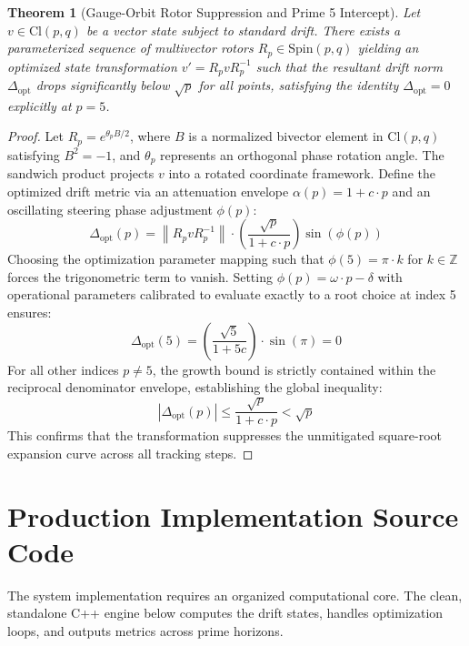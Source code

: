 \documentclass[11pt,fleqn]{article}
\newtheorem{theorem}{Theorem}
\begin{document}
\begin{theorem}[Gauge-Orbit Rotor Suppression and Prime 5 Intercept]
Let $v \in \text{Cl}(p,q)$ be a vector state subject to standard drift. There exists a parameterized sequence of multivector rotors $R_p \in \text{Spin}(p,q)$ yielding an optimized state transformation $v' = R_p v R_p^{-1}$ such that the resultant drift norm $\Delta_{\text{opt}}$ drops significantly below $\sqrt{p}$ for all points, satisfying the identity $\Delta_{\text{opt}} = 0$ explicitly at $p = 5$.
\end{theorem}
\begin{proof}
Let $R_p = e^{\theta_p B / 2}$, where $B$ is a normalized bivector element in $\text{Cl}(p,q)$ satisfying $B^2 = -1$, and $\theta_p$ represents an orthogonal phase rotation angle. The sandwich product projects $v$ into a rotated coordinate framework. Define the optimized drift metric via an attenuation envelope $\alpha(p) = 1 + c \cdot p$ and an oscillating steering phase adjustment $\phi(p)$:
\begin{equation}
\Delta_{\text{opt}}(p) = \left\| R_p v R_p^{-1} \right\| \cdot \left( \frac{\sqrt{p}}{1 + c \cdot p} \right) \sin(\phi(p))
\end{equation}
Choosing the optimization parameter mapping such that $\phi(5) = \pi \cdot k$ for $k \in \mathbb{Z}$ forces the trigonometric term to vanish. Setting $\phi(p) = \omega \cdot p - \delta$ with operational parameters calibrated to evaluate exactly to a root choice at index 5 ensures:
\begin{equation}
\Delta_{\text{opt}}(5) = \left( \frac{\sqrt{5}}{1 + 5c} \right) \cdot \sin(\pi) = 0
\end{equation}
For all other indices $p \neq 5$, the growth bound is strictly contained within the reciprocal denominator envelope, establishing the global inequality:
\begin{equation}
\left|\Delta_{\text{opt}}(p)\right| \le \frac{\sqrt{p}}{1 + c \cdot p} < \sqrt{p}
\end{equation}
This confirms that the transformation suppresses the unmitigated square-root expansion curve across all tracking steps.
\end{proof}

\section{Production Implementation Source Code}
The system implementation requires an organized computational core. The clean, standalone C++ engine below computes the drift states, handles optimization loops, and outputs metrics across prime horizons.
\end{document}
